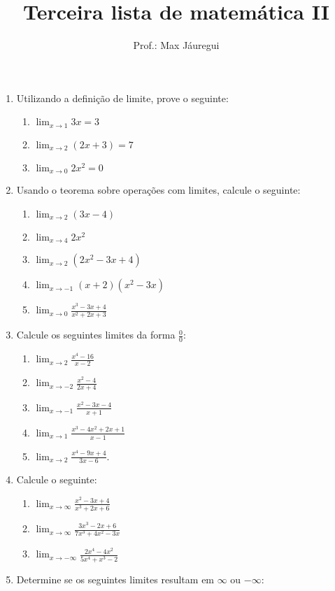 \documentclass[12pt,a4paper]{article}
\title{Terceira lista de matemática II}
\author{Prof.: Max Jáuregui}
\date{}
\newcommand{\ds}{\displaystyle}
\begin{document}
\maketitle

\begin{enumerate}
\item Utilizando a definição de limite, prove o seguinte:
  \begin{enumerate}
  \item $\ds \lim_{x\to 1}3x=3$
  \item $\ds \lim_{x\to 2}(2x+3)=7$
  \item $\ds \lim_{x\to 0}2x^2=0$
  \end{enumerate}
\item Usando o teorema sobre operações com limites, calcule o seguinte:
  \begin{enumerate}
  \item $\ds\lim_{x\to 2}(3x-4)$
  \item $\ds\lim_{x\to 4}2x^2$
  \item $\ds \lim_{x\to 2}(2x^2-3x+4)$
  \item $\ds \lim_{x\to-1}(x+2)(x^2-3x)$
  \item $\ds \lim_{x\to 0}\frac{x^3-3x+4}{x^2+2x+3}$
  \end{enumerate}
\item Calcule os seguintes limites da forma $\ds\frac{0}{0}$:
  \begin{enumerate}
  \item $\ds\lim_{x\to 2}\frac{x^4-16}{x-2}$
  \item $\ds\lim_{x\to -2}\frac{x^2-4}{2x+4}$
  \item $\ds\lim_{x\to -1}\frac{x^2-3x-4}{x+1}$
  \item $\ds\lim_{x\to 1}\frac{x^3-4x^2+2x+1}{x-1}$
  \item $\ds\lim_{x\to 2}\frac{x^4-9x+4}{3x-6}$.
  \end{enumerate}
\item Calcule o seguinte:
  \begin{enumerate}
  \item $\ds\lim_{x\to\infty}\frac{x^2-3x+4}{x^3+2x+6}$
  \item $\ds\lim_{x\to\infty}\frac{3x^3-2x+6}{7x^3+4x^2-3x}$
  \item $\ds\lim_{x\to-\infty}\frac{2x^4-4x^2}{5x^4+x^3-2}$
  \end{enumerate}
\item Determine se os seguintes limites resultam em $\infty$ ou $-\infty$:
  \begin{enumerate}

\end{enumerate}
\end{enumerate}
\end{document}
